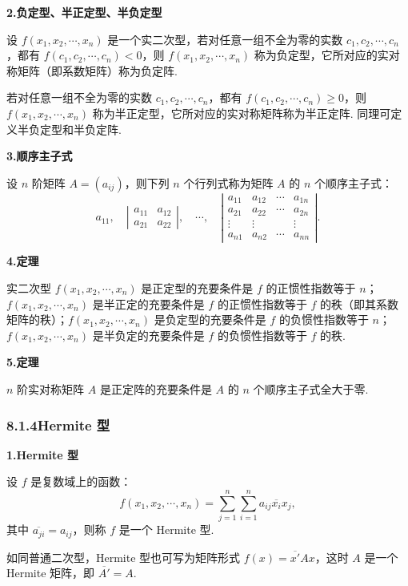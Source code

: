 \documentclass[UTF8,12pt,a4paper,fontset=fandol]{ctexart}
\begin{document}
\noindent\textbf{2.\quad 负定型、半正定型、半负定型}

设 $f(x_1,x_2,\cdots,x_n)$ 是一个实二次型，若对任意一组不全为零的实数 $c_1,c_2,\cdots,c_n$，都有 $f(c_1,c_2,\cdots,c_n)<0$，则 $f(x_1,x_2,\cdots,x_n)$ 称为负定型，它所对应的实对称矩阵（即系数矩阵）称为负定阵.

若对任意一组不全为零的实数 $c_1,c_2,\cdots,c_n$，都有 $f(c_1,c_2,\cdots,c_n)\ge 0$，则 $f(x_1,x_2,\cdots,x_n)$ 称为半正定型，它所对应的实对称矩阵称为半正定阵. 同理可定义半负定型和半负定阵.

\noindent\textbf{3.\quad 顺序主子式}

设 $n$ 阶矩阵 $A=(a_{ij})$，则下列 $n$ 个行列式称为矩阵 $A$ 的 $n$ 个顺序主子式：
\[
a_{11},\quad
\left|\begin{array}{cc}
a_{11} & a_{12}\\
a_{21} & a_{22}
\end{array}\right|,\quad
\cdots,\quad
\left|\begin{array}{cccc}
a_{11} & a_{12} & \cdots & a_{1n}\\
a_{21} & a_{22} & \cdots & a_{2n}\\
\vdots & \vdots &        & \vdots\\
a_{n1} & a_{n2} & \cdots & a_{nn}
\end{array}\right|.
\]

\noindent\textbf{4.\quad 定理}

实二次型 $f(x_1,x_2,\cdots,x_n)$ 是正定型的充要条件是 $f$ 的正惯性指数等于 $n$；$f(x_1,x_2,\cdots,x_n)$ 是半正定的充要条件是 $f$ 的正惯性指数等于 $f$ 的秩（即其系数矩阵的秩）；$f(x_1,x_2,\cdots,x_n)$ 是负定型的充要条件是 $f$ 的负惯性指数等于 $n$；$f(x_1,x_2,\cdots,x_n)$ 是半负定的充要条件是 $f$ 的负惯性指数等于 $f$ 的秩.

\noindent\textbf{5.\quad 定理}

$n$ 阶实对称矩阵 $A$ 是正定阵的充要条件是 $A$ 的 $n$ 个顺序主子式全大于零.

\subsubsection*{8.1.4\quad Hermite 型}

\noindent\textbf{1.\quad Hermite 型}

设 $f$ 是复数域上的函数：
\[
f(x_1,x_2,\cdots,x_n)=\sum_{j=1}^n\sum_{i=1}^n a_{ij}\overline{x_i}x_j,
\]
其中 $\overline{a_{ji}}=a_{ij}$，则称 $f$ 是一个 Hermite 型.

如同普通二次型，Hermite 型也可写为矩阵形式 $f(x)=\overline{x'}Ax$，这时 $A$ 是一个 Hermite 矩阵，即 $\overline{A'}=A$.
\end{document}
